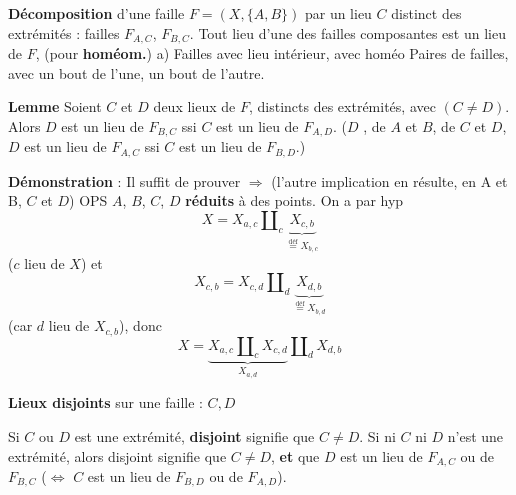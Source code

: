 \documentclass[11pt,a4paper]{article}
\begin{document}

\textbf{Décomposition} d'une faille $F = (X, \{A,B\})$ par un lieu $C$ distinct des extrémités : failles $F_{A,C}$, $F_{B,C}$. Tout lieu d'une des failles composantes est un lieu de $F$, \struck{\ill{}} (pour \textbf{homéom.})
 a) Failles avec lieu intérieur, avec homéo  Paires de failles, avec un bout de l'une, un bout de l'autre.  

\textbf{Lemme} Soient $C$ et $D$ deux lieux de $F$, distincts des extrémités, avec $(C \neq D)$.
Alors $D$ est un lieu de $F_{B,C}$ ssi $C$ est un lieu de $F_{A,D}$. ($D$ ,  \ill{}  de $A$ et $B$,  \ill{} de $C$ et $D$, $D$ est un lieu de $F_{A,C}$ ssi $C$ est un lieu de $F_{B,D}$.)

\textbf{Démonstration} : Il suffit de prouver $\Longrightarrow$ \struck{\ill{}} (l'autre implication en résulte, en \ill{} \ill{} A et B, $C$ et $D$) \struck{\ill{}} OPS $A$, $B$, $C$, $D$ \textbf{réduits} \struck{\ill{}} à des points. On a par hyp 
\[
  X = X_{a,c} \amalg_c \underbrace{X_{c,b}}_{\overset{\text{déf}}{=} X_{b,c}}
\]
($c$ lieu de $X$) et
\[
  X_{c,b} = X_{c,d} \amalg_d \underbrace{X_{d,b}}_{\overset{\text{déf}}{=} X_{b,d}}
\]
(car $d$ lieu de $X_{c,b}$), donc
\[
  X = \underbrace{X_{a,c} \amalg_c X_{c,d}}_{X_{a,d}} \amalg_d X_{d,b}
\]

\textbf{Lieux disjoints} sur une faille : $C, D$ 

 Si $C$ ou $D$ est une extrémité, \textbf{disjoint} signifie que $C \neq D$. Si ni $C$ ni $D$ n'est une extrémité, alors disjoint signifie que \struck{\ill{}} $C \neq D$, \textbf{et} que $D$ est un lieu de $F_{A,C}$ ou de $F_{B,C}$ ($\Longleftrightarrow$ $C$ est un lieu de $F_{B,D}$ ou de $F_{A,D}$).
\end{document}
